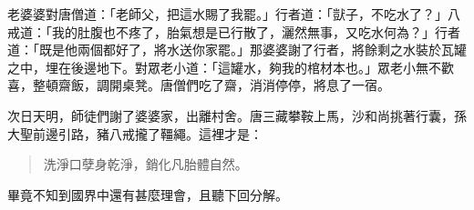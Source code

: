 老婆婆對唐僧道：「老師父，把這水賜了我罷。」行者道：「獃子，不吃水了？」八戒道：「我的肚腹也不疼了，胎氣想是已行散了，灑然無事，又吃水何為？」行者道：「既是他兩個都好了，將水送你家罷。」那婆婆謝了行者，將餘剩之水裝於瓦罐之中，埋在後邊地下。對眾老小道：「這罐水，夠我的棺材本也。」眾老小無不歡喜，整頓齋飯，調開桌凳。唐僧們吃了齋，消消停停，將息了一宿。

次日天明，師徒們謝了婆婆家，出離村舍。唐三藏攀鞍上馬，沙和尚挑著行囊，孫大聖前邊引路，豬八戒攏了韁繩。這裡才是：
\begin{quote}
洗淨口孽身乾淨，銷化凡胎體自然。
\end{quote}

畢竟不知到國界中還有甚麼理會，且聽下回分解。
